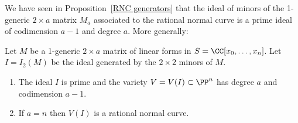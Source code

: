 We have seen in Proposition~\ref{RNC generators} that the ideal of minors of the 1-generic $2\times a$ matrix $M_{a}$ associated to the rational normal curve is a prime ideal of codimension $a-1$ and degree $a$. More generally:

\begin{theorem}\label{1-generic basics} Let $M$ be a 1-generic $2\times a$ matrix of linear forms in $S = \CC[x_0,\dots, x_n]$. 
Let $I = I_2(M)$  be the ideal generated by the $2\times 2$ minors of $M$.
 \begin{enumerate}

\item The ideal $I$ is 
prime and the variety $V = V(I) \subset \PP^n$ has degree $a$ and codimension $a-1$.

\item If $a=n$ then $V(I)$ is a rational normal curve.
\end{enumerate}
\end{theorem}

